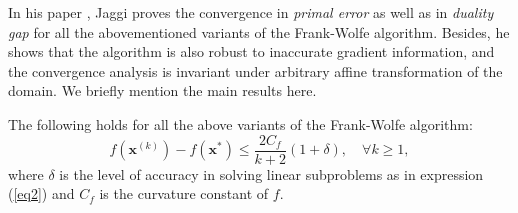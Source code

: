 \documentclass[12pt]{article}
\newenvironment{theorem}[2][Theorem]{\begin{trivlist}
\item[\hskip \labelsep {\bfseries #1}\hskip \labelsep {\bfseries #2.}]}{\end{trivlist}}
\begin{document}
In his paper \cite{J}, Jaggi proves the convergence in \textit{primal error} as well as in \textit{duality gap} for all the abovementioned variants of the Frank-Wolfe algorithm. Besides, he shows that the algorithm is also robust to inaccurate gradient information, and the convergence analysis is invariant under arbitrary affine transformation of the domain. We briefly mention the main results here.
\begin{theorem}{1}
The following holds for all the above variants of the Frank-Wolfe algorithm:
\begin{equation}
    f(\mathbf{x}^{(k)}) - f(\mathbf{x}^{*}) \leq \frac{2C_f}{k+2}(1+\delta), \quad \forall k \geq 1,
\end{equation}
where $\delta$ is the level of accuracy in solving linear subproblems as in expression (\ref{eq2}) and $C_f$ is the curvature constant of $f$.
\end{theorem}
\end{document}
